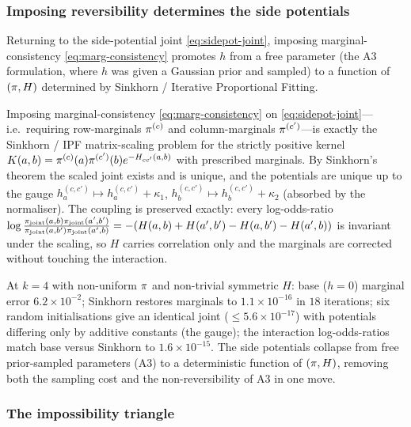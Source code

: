 \subsubsection{Imposing reversibility determines the side potentials}
\label{sec:sinkhorn-suppl}

Returning to the side-potential joint \eqref{eq:sidepot-joint},
imposing marginal-consistency \eqref{eq:marg-consistency} promotes
$h$ from a free parameter (the A3 formulation, where $h$ was given
a Gaussian prior and sampled) to a function of $(\pi,H)$ determined
by Sinkhorn / Iterative Proportional Fitting.

\begin{proposition}
\label{prop:sinkhorn}
Imposing marginal-consistency \eqref{eq:marg-consistency} on
\eqref{eq:sidepot-joint}---i.e.\ requiring row-marginals $\pi^{(c)}$
and column-marginals $\pi^{(c')}$---is exactly the
Sinkhorn / IPF matrix-scaling problem for the strictly positive
kernel $K(a,b)=\pi^{(c)}(a)\pi^{(c')}(b)e^{-H_{cc'}(a,b)}$ with
prescribed marginals. By Sinkhorn's theorem the scaled joint
exists and is unique, and the potentials are unique up to the
gauge $h^{(c,c')}_a\mapsto h^{(c,c')}_a+\kappa_1$,
$h^{(c,c')}_b\mapsto h^{(c,c')}_b+\kappa_2$ (absorbed by the
normaliser). The coupling is preserved exactly: every
log-odds-ratio
$\log\frac{\pi_{\mathrm{joint}}(a,b)\pi_{\mathrm{joint}}(a',b')}{\pi_{\mathrm{joint}}(a,b')\pi_{\mathrm{joint}}(a',b)}=-(H(a,b)+H(a',b')
-H(a,b')-H(a',b))$
is invariant under the scaling, so $H$ carries correlation only and
the marginals are corrected without touching the interaction.
\end{proposition}

At $k=4$ with non-uniform $\pi$ and non-trivial symmetric $H$:
base ($h=0$) marginal error $6.2\times 10^{-2}$; Sinkhorn restores
marginals to $1.1\times 10^{-16}$ in $18$ iterations; six random
initialisations give an identical joint ($\le 5.6\times 10^{-17}$)
with potentials differing only by additive constants (the gauge);
the interaction log-odds-ratios match base versus Sinkhorn to
$1.6\times 10^{-15}$. The side potentials collapse from free
prior-sampled parameters (A3) to a deterministic function of
$(\pi,H)$, removing both the sampling cost and the
non-reversibility of A3 in one move.

\subsubsection{The impossibility triangle}
\label{sec:triangle-suppl}

